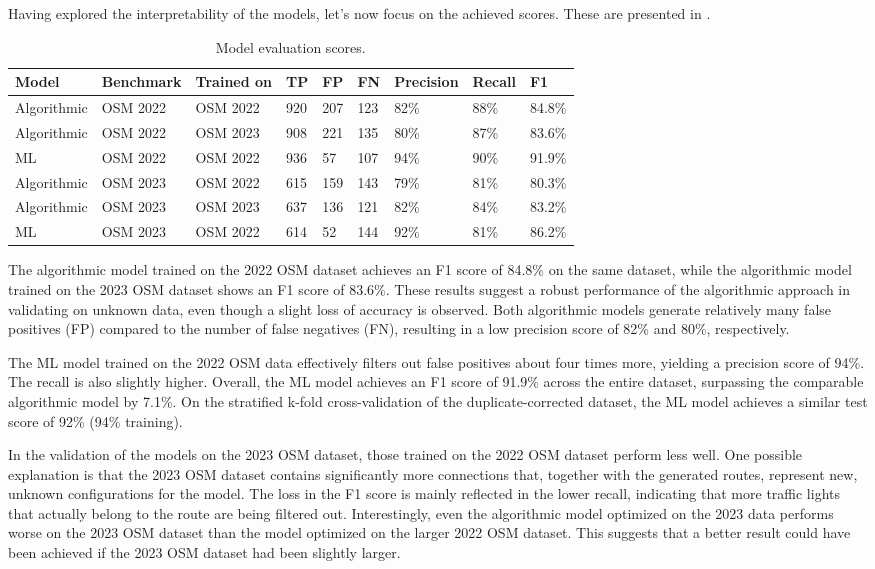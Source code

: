 Having explored the interpretability of the models, let's now focus on the achieved scores. These are presented in .

\begin{table}[h]
\caption{Model evaluation scores.}
\begin{tabular}{@{}lllllllll@{}}
\toprule
  \textbf{Model} & \textbf{Benchmark} & \textbf{Trained on} & \textbf{TP} & \textbf{FP} & \textbf{FN} & \textbf{Precision} & \textbf{Recall} & \textbf{F1} \\
  \midrule
  Algorithmic & OSM 2022 & OSM 2022 & 920 & 207 & 123 & 82\% & 88\% & 84.8\% \\
  Algorithmic & OSM 2022 & OSM 2023 & 908 & 221 & 135 & 80\% & 87\% & 83.6\% \\
  ML          & OSM 2022 & OSM 2022 & 936 & 57 & 107 & 94\% & 90\% & 91.9\% \\
  \midrule
  Algorithmic & OSM 2023 & OSM 2022 & 615 & 159 & 143 & 79\% & 81\% & 80.3\% \\
  Algorithmic & OSM 2023 & OSM 2023 & 637 & 136 & 121 & 82\% & 84\% & 83.2\% \\
  ML          & OSM 2023 & OSM 2022 & 614 & 52 & 144 & 92\% & 81\% & 86.2\% \\
\bottomrule
\end{tabular}
\label{tab:model-scores}
\end{table}

The algorithmic model trained on the 2022 OSM dataset achieves an F1 score of 84.8\% on the same dataset, while the algorithmic model trained on the 2023 OSM dataset shows an F1 score of 83.6\%. These results suggest a robust performance of the algorithmic approach in validating on unknown data, even though a slight loss of accuracy is observed. Both algorithmic models generate relatively many false positives (FP) compared to the number of false negatives (FN), resulting in a low precision score of 82\% and 80\%, respectively.

The ML model trained on the 2022 OSM data effectively filters out false positives about four times more, yielding a precision score of 94\%. The recall is also slightly higher. Overall, the ML model achieves an F1 score of 91.9\% across the entire dataset, surpassing the comparable algorithmic model by 7.1\%. On the stratified k-fold cross-validation of the duplicate-corrected dataset, the ML model achieves a similar test score of 92\% (94\% training).

In the validation of the models on the 2023 OSM dataset, those trained on the 2022 OSM dataset perform less well. One possible explanation is that the 2023 OSM dataset contains significantly more connections that, together with the generated routes, represent new, unknown configurations for the model. The loss in the F1 score is mainly reflected in the lower recall, indicating that more traffic lights that actually belong to the route are being filtered out. Interestingly, even the algorithmic model optimized on the 2023 data performs worse on the 2023 OSM dataset than the model optimized on the larger 2022 OSM dataset. This suggests that a better result could have been achieved if the 2023 OSM dataset had been slightly larger.

